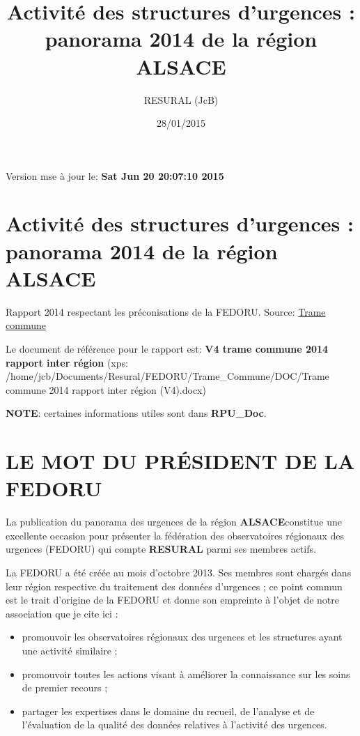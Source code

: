 \documentclass[]{article}
\title{Activité des structures d'urgences : panorama 2014 de la région ALSACE}
\author{RESURAL (JcB)}
\date{28/01/2015}
\begin{document}
\maketitle


{
\hypersetup{linkcolor=black}
\setcounter{tocdepth}{2}
\tableofcontents
}
Version mse à jour le: \textbf{Sat Jun 20 20:07:10 2015}

\section{Activité des structures d'urgences : panorama 2014 de la région
ALSACE}\label{activite-des-structures-durgences-panorama-2014-de-la-region-alsace}

Rapport 2014 respectant les préconisations de la FEDORU. Source:
\href{https://docs.google.com/document/d/101LYVqVLeHZnrujfMm3aqBYfbOwx3CPEB3Y-Lbud2Ls/edit}{Trame
commune}

Le document de référence pour le rapport est: \textbf{V4 trame commune
2014 rapport inter région} (xps:
/home/jcb/Documents/Resural/FEDORU/Trame\_Commune/DOC/Trame commune 2014
rapport inter région (V4).docx)

\textbf{NOTE}: certaines informations utiles sont dans
\textbf{RPU\_Doc}.

\section{LE MOT DU PRÉSIDENT DE LA
FEDORU}\label{le-mot-du-president-de-la-fedoru}

La publication du panorama des urgences de la région
\textbf{ALSACE}constitue une excellente occasion pour présenter la
fédération des observatoires régionaux des urgences (FEDORU) qui compte
\textbf{RESURAL} parmi ses membres actifs.

La FEDORU a été créée au mois d'octobre 2013. Ses membres sont chargés
dans leur région respective du traitement des données d'urgences ; ce
point commun est le trait d'origine de la FEDORU et donne son empreinte
à l'objet de notre association que je cite ici :

\begin{itemize}
\itemsep1pt\parskip0pt
\item
  promouvoir les observatoires régionaux des urgences et les structures
  ayant une activité similaire ;
\item
  promouvoir toutes les actions visant à améliorer la connaissance sur
  les soins de premier recours ;
\item
  partager les expertises dans le domaine du recueil, de l'analyse et de
  l'évaluation de la qualité des données relatives à l'activité des
  urgences.
\end{itemize}
\end{document}
